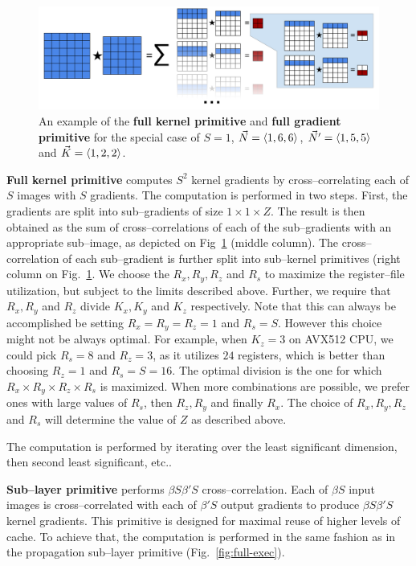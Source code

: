   \begin{figure}
     \centering
     \includegraphics[width=0.99\linewidth]{fig/update2}
     \caption{An example of the {\bf full kernel primitive} and {\bf
         full gradient primitive} for the special case of $S=1$,
       $\vec{N}=\langle1,6,6\rangle$, $\vec{N}' = \langle1,5,5\rangle$ and
       $\vec{K}=\langle1,2,2\rangle$.}
     \label{fig:conv-decomposition}
   \end{figure}

  {\bf Full kernel primitive} computes $S^2$ kernel gradients by
  cross--correlating each of $S$ images with $S$ gradients.  The
  computation is performed in two steps.  First, the gradients are
  split into sub--gradients of size $1 \times 1 \times Z$.  The result
  is then obtained as the sum of cross--correlations of each of the
  sub--gradients with an appropriate sub--image, as depicted on
  Fig~\ref{fig:conv-decomposition} (middle column).  The
  cross--correlation of each sub--gradient is further split into
  sub--kernel primitives (right column on
  Fig.~\ref{fig:conv-decomposition}.  We choose the $R_x, R_y, R_z$ and
  $R_s$ to maximize the register--file utilization, but subject to the
  limits described above.  Further, we require that $R_x, R_y$ and
  $R_z$ divide $K_x, K_y$ and $K_z$ respectively.  Note that this can
  always be accomplished be setting $R_x=R_y=R_z=1$ and $R_s=S$.
  However this choice might not be always optimal.  For example, when
  $K_z=3$ on AVX512 CPU, we could pick $R_s=8$ and $R_z=3$, as it
  utilizes $24$ registers, which is better than choosing $R_z=1$ and
  $R_s=S=16$.  The optimal division is the one for which $R_x \times
  R_y \times R_z \times R_s$ is maximized.  When more combinations are
  possible, we prefer ones with large values of $R_s$, then $R_z, R_y$
  and finally $R_x$.  The choice of $R_x, R_y, R_z$ and $R_s$ will
  determine the value of $Z$ as described above.

  The computation is performed by iterating over the least significant
  dimension, then second least significant, etc..

  {\bf Sub--layer primitive} performs $\beta S \beta' S$
  cross--correlation.  Each of $\beta S$ input images is
  cross--correlated with each of $\beta'S$ output gradients to produce
  $\beta S \beta' S$ kernel gradients.  This primitive is designed for
  maximal reuse of higher levels of cache.  To achieve that, the
  computation is performed in the same fashion as in the propagation
  sub--layer primitive (Fig.~\ref{fig:full-exec}).


